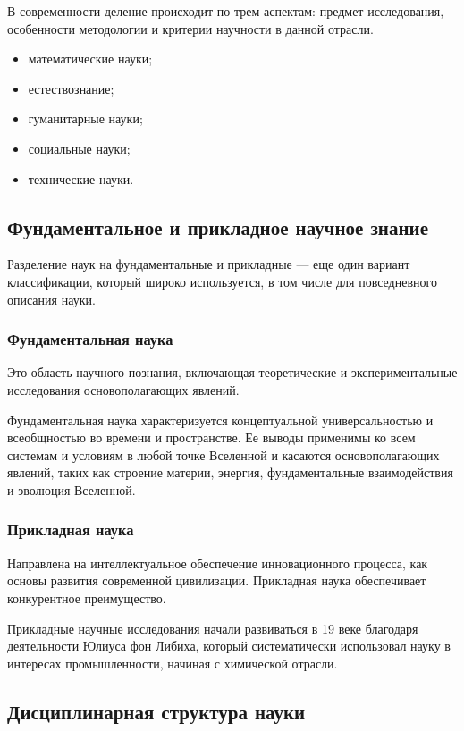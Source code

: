 В современности деление происходит по трем аспектам: предмет исследования, особенности методологии и критерии научности в данной отрасли.
\begin{itemize}
    \item математические науки;
    \item естествознание;
    \item гуманитарные науки;
    \item социальные науки;
    \item технические науки.
\end{itemize}
 
\subsection{Фундаментальное и прикладное научное знание} 

Разделение наук на фундаментальные и прикладные --- еще один вариант классификации, который широко используется, в том числе для повседневного описания науки. 

\subsubsection{Фундаментальная наука}

Это область научного познания, включающая теоретические и экспериментальные исследования
основополагающих явлений. 

Фундаментальная наука характеризуется концептуальной универсальностью и всеобщностью во времени и пространстве. Ее выводы применимы ко всем системам и условиям в любой точке Вселенной и касаются основополагающих явлений, таких как строение материи, энергия, фундаментальные взаимодействия и эволюция Вселенной. 

\subsubsection{Прикладная наука}  

Направлена на интеллектуальное обеспечение инновационного процесса, как основы развития современной цивилизации. Прикладная наука обеспечивает конкурентное преимущество.

Прикладные научные исследования начали развиваться в 19 веке благодаря деятельности Юлиуса фон Либиха, который систематически использовал науку в интересах промышленности, начиная с химической отрасли. 

\subsection{Дисциплинарная структура науки}

